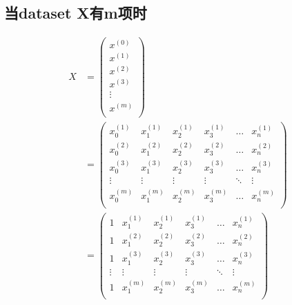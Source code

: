 \documentclass[12pt]{article}   %
\begin{document}
\subsection{当dataset X有m项时}
\begin{equation}
\begin{aligned}
X & = 
	\left(
		\begin{matrix}
			x^{(0)} \\
			x^{(1)} \\
			x^{(2)} \\
			x^{(3)} \\
			\vdots \\
			x^{(m)} \\
		\end{matrix}
	\right) \\
& =
	\left(
		\begin{matrix}
		x_0^{(1)} & x_1^{(1)} & x_2^{(1)} & x_3^{(1)} & \dots & x_n^{(1)} \\
		x_0^{(2)} & x_1^{(2)} & x_2^{(2)} & x_3^{(2)} & \dots & x_n^{(2)} \\
		x_0^{(3)} & x_1^{(3)} & x_2^{(3)} & x_3^{(3)} & \dots & x_n^{(3)} \\
		\vdots    & \vdots    & \vdots    & \vdots    & \ddots & \vdots   \\
		x_0^{(m)} & x_1^{(m)} & x_2^{(m)} & x_3^{(m)} & \dots & x_n^{(m)} \\
		\end{matrix}
	\right) \\
& =
		\left(
		\begin{matrix}
		1 & x_1^{(1)} & x_2^{(1)} & x_3^{(1)} & \dots & x_n^{(1)} \\
		1 & x_1^{(2)} & x_2^{(2)} & x_3^{(2)} & \dots & x_n^{(2)} \\
		1 & x_1^{(3)} & x_2^{(3)} & x_3^{(3)} & \dots & x_n^{(3)} \\
		\vdots    & \vdots    & \vdots    & \vdots    & \ddots & \vdots   \\
		1 & x_1^{(m)} & x_2^{(m)} & x_3^{(m)} & \dots & x_n^{(m)} \\
		\end{matrix}
	\right)
\end{aligned}
\end{equation}
\end{document}
